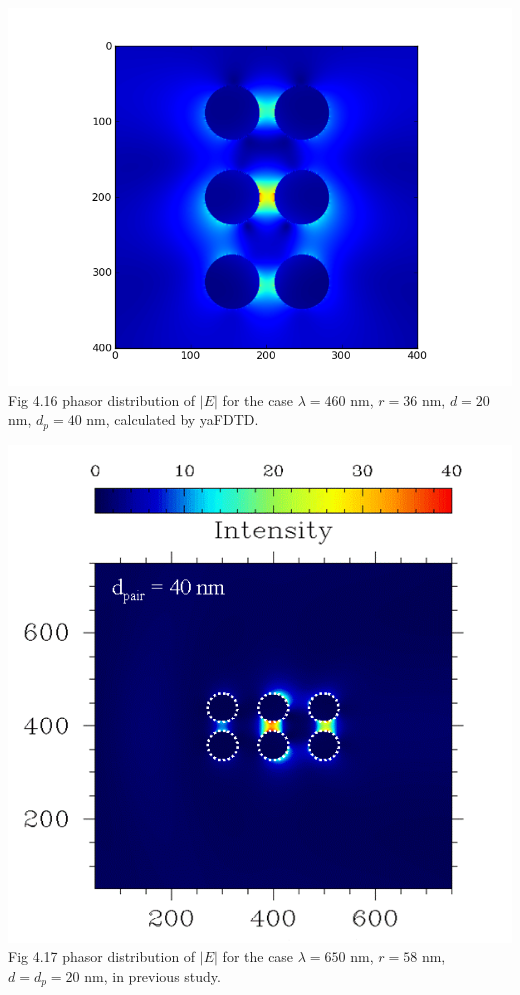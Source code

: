 \documentclass[openany]{book}
\begin{document}
\begin{center}
\includegraphics[scale=0.8]{images/etotal-d40.png}\\
Fig 4.16
phasor distribution of $|E|$ for the case $\lambda = 460$ nm, $r = 36$ nm, $d = 20$ nm, $d_p = 40$ nm, calculated by yaFDTD.
\end{center}

\begin{center}
\includegraphics[scale=0.5]{images/d40.png}\\
Fig 4.17
phasor distribution of $|E|$ for the case $\lambda = 650$ nm, $r = 58$ nm, $d = d_p = 20$ nm, in previous study.
\end{center}
\end{document}
